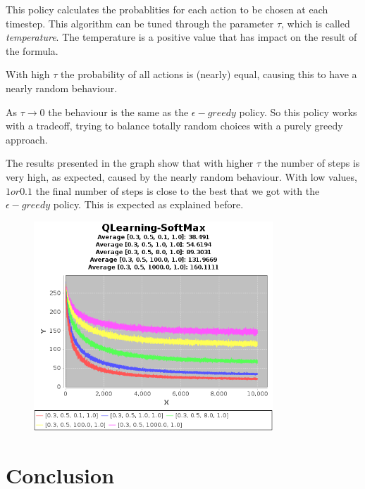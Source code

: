 \documentclass{article}
\begin{document}
This policy calculates the probablities for each action to be chosen at each
timestep. This algorithm can be tuned through the parameter $\tau$, which is
called \emph{temperature}.
The temperature is a positive value that has impact on the result of the
formula.

With high $\tau$ the probability of all actions is (nearly) equal, causing
this to have a nearly random behaviour.

As $\tau \rightarrow 0$ the behaviour is the same as the $\epsilon-greedy$
policy.
So this policy works with a tradeoff, trying to balance totally random choices with a purely greedy approach.

The results presented in the graph show that with higher $\tau$ the number of
steps is very high, as expected, caused by the nearly random behaviour. With low
values, $1 or 0.1$ the final number of steps is close to the best that we got
with the $\epsilon-greedy$ policy. This is expected as explained before.

\begin{figure}[h]
\centering
\includegraphics[width=0.8\textwidth]{res/alpha_03_gamma_05_temp_01_to_1000_IV_1.png}
\end{figure}

\section{Conclusion}
\end{document}
